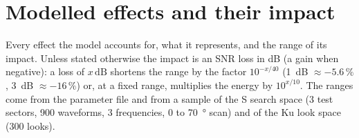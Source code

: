 \documentclass[11pt,a4paper]{article}
\newcommand{\dB}{\,\mathrm{dB}}
\begin{document}
\section{Modelled effects and their impact}\label{sec:effects}
Every effect the model accounts for, what it represents, and the range of its impact. Unless stated otherwise the
impact is an SNR loss in dB (a gain when negative): a loss of $x\dB$ shortens the range by the factor
$10^{-x/40}$ (\SI{1}{dB} $\approx -5.6\,\%$, \SI{3}{dB} $\approx -16\,\%$) or, at a fixed range, multiplies the energy
by $10^{x/10}$. The ranges come from the parameter file and from a sample of the S search space (3 test sectors,
900 waveforms, 3 frequencies, 0 to \SI{70}{\degree} scan) and of the Ku look space (300 looks).
\end{document}
